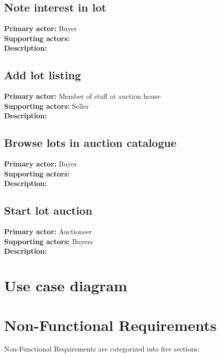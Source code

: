 \documentclass[titlepage, 12pt]{extarticle}
\begin{document}
\subsection{Note interest in lot}
{\bf Primary actor: } Buyer
\\{\bf Supporting actors: }
\\{\bf Description: }
\subsection{Add lot listing}
{\bf Primary actor: } Member of staff at auction house
\\{\bf Supporting actors: } Seller
\\{\bf Description: } 
\subsection{Browse lots in auction catalogue}
{\bf Primary actor: } Buyer
\\{\bf Supporting actors: }
\\{\bf Description: } 
\subsection{Start lot auction}
{\bf Primary actor: } Auctioneer
\\{\bf Supporting actors: } Buyers
\\{\bf Description: }

\section{Use case diagram}

\section{Non-Functional Requirements}
Non-Functional Requirements are categorized into five sections:
\end{document}
